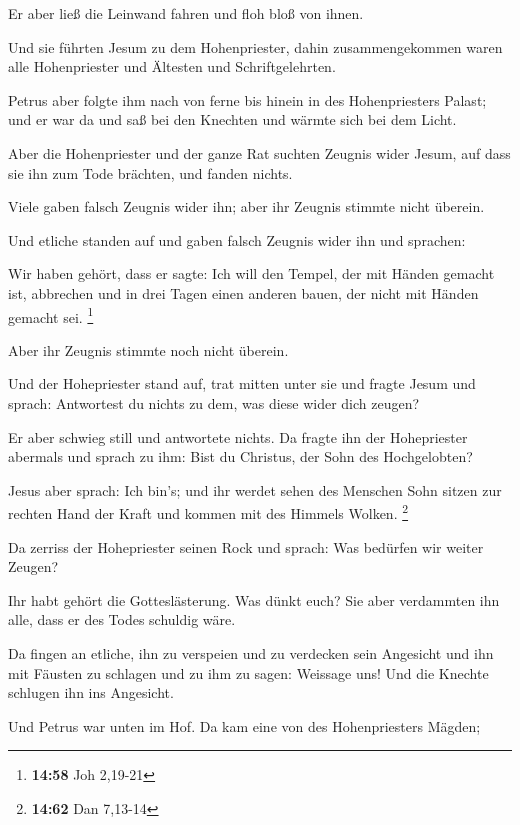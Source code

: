 Er aber ließ die Leinwand fahren und floh bloß von
ihnen.

 Und sie führten Jesum zu dem Hohenpriester, dahin
zusammengekommen waren alle Hohenpriester und Ältesten und
Schriftgelehrten.

 Petrus aber folgte ihm nach von ferne bis hinein in des
Hohenpriesters Palast; und er war da und saß bei den Knechten und wärmte
sich bei dem Licht.

 Aber die Hohenpriester und der ganze Rat suchten Zeugnis
wider Jesum, auf dass sie ihn zum Tode brächten, und fanden nichts.

 Viele gaben falsch Zeugnis wider ihn; aber ihr Zeugnis
stimmte nicht überein.

 Und etliche standen auf und gaben falsch Zeugnis wider
ihn und sprachen:

 Wir haben gehört, dass er sagte: Ich will den Tempel,
der mit Händen gemacht ist, abbrechen und in drei Tagen einen anderen
bauen, der nicht mit Händen gemacht sei. \footnote{\textbf{14:58} Joh
  2,19-21}

 Aber ihr Zeugnis stimmte noch nicht überein.

 Und der Hohepriester stand auf, trat mitten unter sie
und fragte Jesum und sprach: Antwortest du nichts zu dem, was diese
wider dich zeugen?

 Er aber schwieg still und antwortete nichts. Da fragte
ihn der Hohepriester abermals und sprach zu ihm: Bist du Christus, der
Sohn des Hochgelobten?

 Jesus aber sprach: Ich bin's; und ihr werdet sehen des
Menschen Sohn sitzen zur rechten Hand der Kraft und kommen mit des
Himmels Wolken. \footnote{\textbf{14:62} Dan 7,13-14}

 Da zerriss der Hohepriester seinen Rock und sprach: Was
bedürfen wir weiter Zeugen?

 Ihr habt gehört die Gotteslästerung. Was dünkt euch? Sie
aber verdammten ihn alle, dass er des Todes schuldig wäre.

 Da fingen an etliche, ihn zu verspeien und zu verdecken
sein Angesicht und ihn mit Fäusten zu schlagen und zu ihm zu sagen:
Weissage uns! Und die Knechte schlugen ihn ins Angesicht.

 Und Petrus war unten im Hof. Da kam eine von des
Hohenpriesters Mägden;

